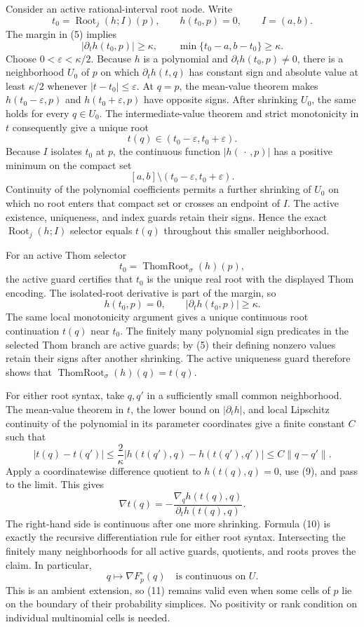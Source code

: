 Consider an active rational-interval root node.  Write
\[
 t_0=\operatorname{Root}_j(h;I)(p),
 \qquad h(t_0,p)=0,
 \qquad I=(a,b).
\]
The margin in (5) implies
\[
 |\partial_t h(t_0,p)|\geq\kappa,
 \qquad
 \min\{t_0-a,b-t_0\}\geq\kappa. \tag{6}
\]
Choose \(0<\varepsilon<\kappa/2\).  Because \(h\) is a polynomial and \(\partial_t h(t_0,p)\neq0\), there is a neighborhood \(U_0\) of \(p\) on which \(\partial_t h(t,q)\) has constant sign and absolute value at least \(\kappa/2\) whenever \(|t-t_0|\leq\varepsilon\).  At \(q=p\), the mean-value theorem makes \(h(t_0-\varepsilon,p)\) and \(h(t_0+\varepsilon,p)\) have opposite signs.  After shrinking \(U_0\), the same holds for every \(q\in U_0\).  The intermediate-value theorem and strict monotonicity in \(t\) consequently give a unique root
\[
 t(q)\in(t_0-\varepsilon,t_0+\varepsilon). \tag{7}
\]
Because \(I\) isolates \(t_0\) at \(p\), the continuous function \(|h(\,\cdot\,,p)|\) has a positive minimum on the compact set
\[
 [a,b]\setminus(t_0-\varepsilon,t_0+\varepsilon).
\]
Continuity of the polynomial coefficients permits a further shrinking of \(U_0\) on which no root enters that compact set or crosses an endpoint of \(I\).  The active existence, uniqueness, and index guards retain their signs.  Hence the exact \(\operatorname{Root}_j(h;I)\) selector equals \(t(q)\) throughout this smaller neighborhood.

For an active Thom selector
\[
 t_0=\operatorname{ThomRoot}_{\sigma}(h)(p),
\]
the active guard certifies that \(t_0\) is the unique real root with the displayed Thom encoding.  The isolated-root derivative is part of the margin, so
\[
 h(t_0,p)=0,
 \qquad |\partial_t h(t_0,p)|\geq\kappa. \tag{8}
\]
The same local monotonicity argument gives a unique continuous root continuation \(t(q)\) near \(t_0\).  The finitely many polynomial sign predicates in the selected Thom branch are active guards; by (5) their defining nonzero values retain their signs after another shrinking.  The active uniqueness guard therefore shows that \(\operatorname{ThomRoot}_{\sigma}(h)(q)=t(q)\).

For either root syntax, take \(q,q'\) in a sufficiently small common neighborhood.  The mean-value theorem in \(t\), the lower bound on \(|\partial_t h|\), and local Lipschitz continuity of the polynomial in its parameter coordinates give a finite constant \(C\) such that
\[
 |t(q)-t(q')|
 \leq \frac{2}{\kappa}
       |h(t(q'),q)-h(t(q'),q')|
 \leq C\|q-q'\|. \tag{9}
\]
Apply a coordinatewise difference quotient to \(h(t(q),q)=0\), use (9), and pass to the limit.  This gives
\[
 \nabla t(q)
 =-\frac{\nabla_q h(t(q),q)}{\partial_t h(t(q),q)}. \tag{10}
\]
The right-hand side is continuous after one more shrinking.  Formula (10) is exactly the recursive differentiation rule for either root syntax.  Intersecting the finitely many neighborhoods for all active guards, quotients, and roots proves the claim.  In particular,
\[
 q\longmapsto\nabla F_p^{\circ}(q)
 \quad\text{is continuous on }U. \tag{11}
\]
This is an ambient extension, so (11) remains valid even when some cells of \(p\) lie on the boundary of their probability simplices.  No positivity or rank condition on individual multinomial cells is needed.

